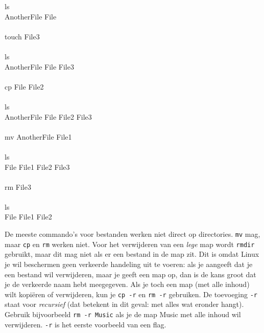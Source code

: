 \begin{bash}
\p ls\\
AnotherFile  File\\
\\
\p touch File3\\
\\
\p ls\\
AnotherFile  File  File3\\
\\
\p cp File File2\\
\\
\p ls\\
AnotherFile  File  File2  File3\\
\\
\p mv AnotherFile File1\\
\\
\p ls\\
File  File1  File2  File3\\
\\
\p rm File3\\
\\
\p ls\\
File  File1  File2\\
\end{bash}

De meeste commando's voor bestanden werken niet direct op directories. \texttt{mv} mag, maar \texttt{cp} en \texttt{rm} werken niet. Voor het verwijderen van een \emph{lege} map wordt \texttt{rmdir} gebruikt, maar dit mag niet als er een bestand in de map zit. Dit is omdat Linux je wil beschermen geen verkeerde handeling uit te voeren: als je aangeeft dat je een bestand wil verwijderen, maar je geeft een map op, dan is de kans groot dat je de verkeerde naam hebt meegegeven. Als je toch een map (met alle inhoud) wilt kopiëren of verwijderen, kun je \texttt{cp\ -r} en \texttt{rm\ -r} gebruiken. De toevoeging \texttt{-r} staat voor \emph{recursief} (dat betekent in dit geval: met alles wat eronder hangt). Gebruik bijvoorbeeld \texttt{rm\ -r\ Music} als je de map Music met alle inhoud wil verwijderen. \texttt{-r} is het eerste voorbeeld van een flag.


